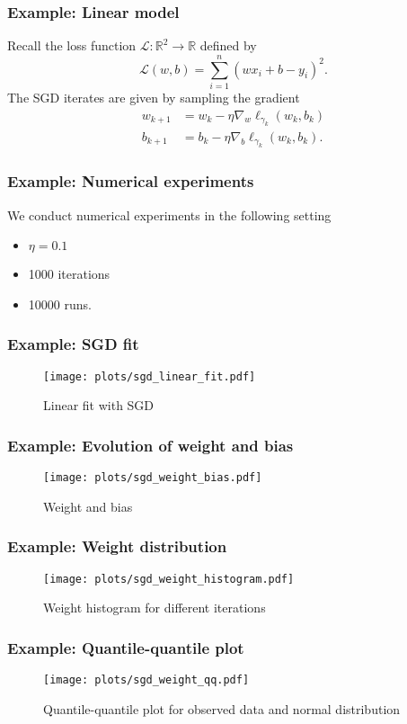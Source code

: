 \documentclass[17pt,institute=e10]{tuhh_presentation}
\newcommand{\R}{\mathbb{R}}
\newcommand{\CL}{\mathcal{L}}
\begin{document}
\begin{frame}[fragile]
  \frametitle{Example: Linear model}
  Recall the loss function $\CL : \R^2 \rightarrow \R$ defined by
  \begin{equation*}
    \CL(w,b) = \sum_{i = 1}^{n} \left(w x_i + b - y_i\right)^2.
  \end{equation*}
  The SGD iterates are given by sampling the gradient
  \begin{align*}
    w_{k+1} &= w_k - \eta \nabla_w \ell_{\gamma_k}(w_k, b_k) \\
    b_{k+1} &= b_k - \eta \nabla_b \ell_{\gamma_k}(w_k, b_k).
  \end{align*}
\end{frame}
\begin{frame}[fragile]
  \frametitle{Example: Numerical experiments}
    We conduct numerical experiments in the following setting
    \begin{itemize}
      \item $\eta = 0.1$
      \item 1000 iterations 
      \item 10000 runs.
    \end{itemize}
\end{frame}
\begin{frame}[fragile]
  \frametitle{Example: SGD fit}
    \vspace{-1cm}
    \begin{figure}
      \centering
      \texttt{[image: plots/sgd\_linear\_fit.pdf]}
      \caption{Linear fit with SGD}
    \end{figure}
\end{frame}
\begin{frame}[fragile]
  \frametitle{Example: Evolution of weight and bias}
    \vspace{-1cm}
    \begin{figure}
      \centering
      \texttt{[image: plots/sgd\_weight\_bias.pdf]}
      \caption{Weight and bias}
    \end{figure}
\end{frame}
\begin{frame}[fragile]
  \frametitle{Example: Weight distribution}
    \vspace{-1cm}
    \begin{figure}
      \centering
      \texttt{[image: plots/sgd\_weight\_histogram.pdf]}
      \caption{Weight histogram for different iterations}
    \end{figure}
\end{frame}
\begin{frame}[fragile]
  \frametitle{Example: Quantile-quantile plot}
    \vspace{-1cm}
    \begin{figure}
      \centering
      \texttt{[image: plots/sgd\_weight\_qq.pdf]}
      \caption{Quantile-quantile plot for observed data and normal distribution}
    \end{figure}
\end{frame}
\end{document}
